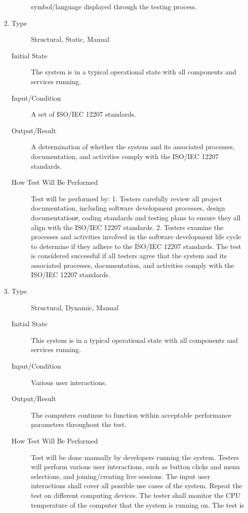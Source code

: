\documentclass[12pt, titlepage]{article}
\begin{document}
\begin{enumerate}[NFR-T1]
\begin{description}
    symbol/language displayed through the testing process.
  \end{description}
\item \label{NFRT28}
  \begin{description}
  \item[Type] Structural, Static, Manual
  \item[Initial State] The system is in a typical operational state with all
    components and services running.
  \item[Input/Condition] A set of ISO/IEC 12207 standards.
  \item[Output/Result] A determination of whether the system and its associated
    processes, documentation, and activities comply with the ISO/IEC 12207
    standards.
  \item[How Test Will Be Performed] Test will be performed by: 1. Testers
    carefully review all project documentation, including software development
    processes, design documentation\sout{s}, coding standards and testing plans to
    ensure they all align with the ISO/IEC 12207 standards. 2. Testers examine
    the processes and activities involved in the software development life cycle
    to determine if they adhere to the ISO/IEC 12207 standards. The test is
    considered successful if all testers agree that the system and its
    associated processes, documentation, and activities comply with the ISO/IEC
    12207 standards.
  \end{description}
\item \label{NFRT29}
  \begin{description}
  \item[Type] Structural, Dynamic, Manual
  \item[Initial State] This system is in a typical operational state with all
    components and services running.
  \item[Input/Condition] Various user interactions.
  \item[Output/Result] The computers continue to function within acceptable
    performance parameters throughout the test.
  \item[How Test Will Be Performed] Test will be done manually by developers
    running the system. Testers will perform various user interactions, such as
    button clicks and menu selections, and joining/creating live sessions. The
    input user interactions shall cover all possible use cases of the system.
    Repeat the test on different computing devices. The tester shall monitor the
    CPU temperature of the computer that the system is running on. The test is

\end{description}
\end{enumerate}
\end{document}
